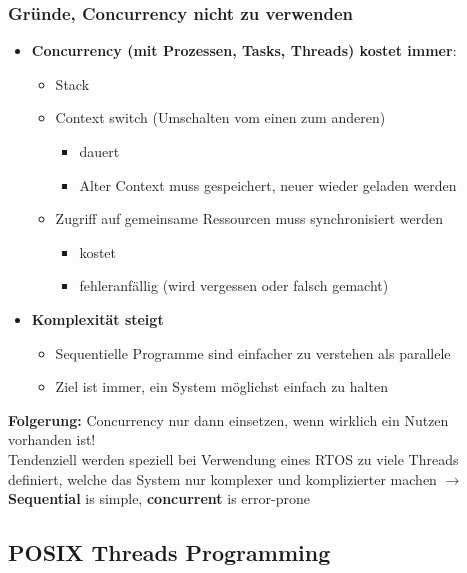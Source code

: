 \subsubsection{Gründe, Concurrency nicht zu verwenden}
\begin{itemize}
  \item \textbf{Concurrency (mit Prozessen, Tasks, Threads) kostet immer}:
        \begin{itemize}
          \item Stack
          \item Context switch (Umschalten vom einen zum anderen)
                \begin{itemize}
                  \item dauert
                  \item Alter Context muss gespeichert, neuer wieder geladen werden
                \end{itemize}
          \item Zugriff auf gemeinsame Ressourcen muss synchronisiert werden
                \begin{itemize}
                  \item kostet
                  \item fehleranfällig (wird vergessen oder falsch gemacht)
                \end{itemize}
        \end{itemize}
  \item \textbf{Komplexität steigt}
        \begin{itemize}
          \item Sequentielle Programme sind einfacher zu verstehen als parallele
          \item Ziel ist immer, ein System möglichst einfach zu halten
        \end{itemize}
\end{itemize}

\textbf{Folgerung:} Concurrency nur dann einsetzen, wenn wirklich ein Nutzen vorhanden ist!\\
Tendenziell werden speziell bei Verwendung eines RTOS zu viele Threads definiert, welche das System nur komplexer und komplizierter machen $\rightarrow$ \textbf{Sequential} is simple, \textbf{concurrent} is error-prone

\subsection{POSIX Threads Programming}
